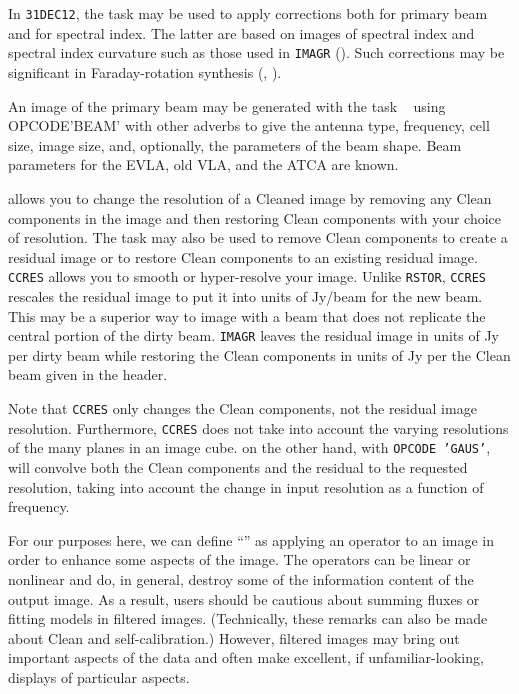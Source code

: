     In {\tt 31DEC12}, the task {\tt {}} may be used to
apply corrections both for primary beam and for spectral index.  The
latter are based on images of spectral index and spectral index
curvature such as those used in {\tt IMAGR} ().  Such
corrections may be significant in Faraday-rotation synthesis
(, ).

     An image of the primary beam may be generated with the task {\tt
{}} using {\us OPCODE\qs 'BEAM' \CR} with other adverbs to
give the antenna type, frequency, cell size, image size, and,
optionally, the parameters of the beam shape.  Beam parameters for the
EVLA, old VLA, and the ATCA are known.

{}

{\tt {}} allows you to change the resolution of a Cleaned
image by removing any Clean components in the image and then restoring
Clean components with your choice of resolution.  The task may also
be used to remove Clean components to create a residual image or to
restore Clean components to an existing residual image.  {\tt CCRES}
allows you to smooth or hyper-resolve your image.  Unlike {\tt RSTOR},
{\tt CCRES} rescales the residual image to put it into units of
Jy/beam for the new beam.  This may be a superior way to image with a
beam that does not replicate the central portion of the dirty beam.
{\tt IMAGR} leaves the residual image in units of Jy per dirty beam
while restoring the Clean components in units of Jy per the Clean beam
given in the header.

Note that {\tt CCRES} only changes the Clean components, not the
residual image resolution.  Furthermore, {\tt CCRES} does not take
into account the varying resolutions of the many planes in an image
cube.  {\tt {}} on the other hand, with {\tt OPCODE 'GAUS'},
will convolve both the Clean components and the residual to the
requested resolution, taking into account the change in input
resolution as a function of frequency.


     For our purposes here, we can define ``'' as
applying an operator to an image in order to enhance some aspects of
the image.  The operators can be linear or nonlinear and do, in
general, destroy some of the information content of the output image.
As a result, users should be cautious about summing fluxes or fitting
models in filtered images.  (Technically, these remarks can also be
made about Clean and self-calibration.)  However, filtered images may
bring out important aspects of the data and often make excellent, if
unfamiliar-looking, displays of particular aspects.

